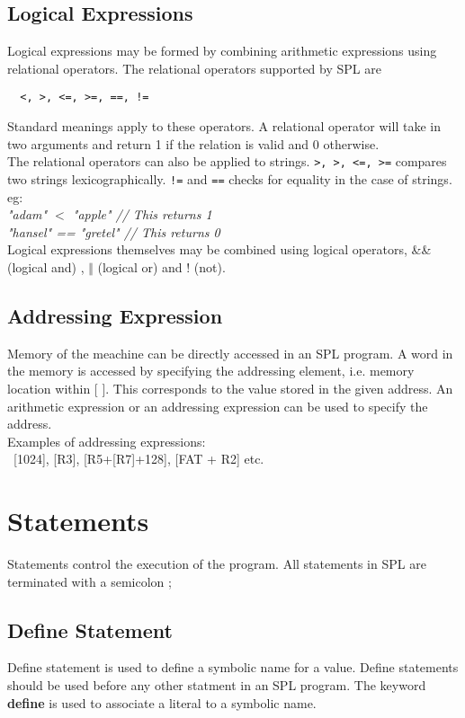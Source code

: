 \documentclass[11pt]{article}
\begin{document}
\subsection{Logical Expressions}

Logical expressions may be formed by combining arithmetic expressions using relational operators. 
The relational operators supported by SPL are \begin{verbatim}  <, >, <=, >=, ==, !=
\end{verbatim}
Standard  meanings apply to these operators. A relational operator will take in two arguments and return 1 if the relation is valid and 0 otherwise. \\
The relational operators can also be applied to strings. \texttt{>, >, <=, >=} compares two strings lexicographically.  \texttt{!=} and \texttt{==} checks for equality in the case of strings. eg:\\
     \textit{"adam" $<$ "apple" // This returns 1 }\\
     \textit{"hansel" == "gretel" // This returns 0 }\\
Logical expressions themselves may be combined using logical operators, \&\& (logical and) ,  $\Vert$ (logical or) and ! (not).



\subsection{Addressing Expression}
Memory of the meachine can be directly accessed in an SPL program. A word in the memory is accessed by specifying the addressing element, i.e. memory location within [ ]. This  corresponds to the value stored in the given address. An arithmetic expression or an addressing expression can be used to specify the address. \\

Examples of addressing expressions: \\\   
 [1024], [R3], [R5+[R7]+128], [FAT + R2] etc.

\section{Statements}

Statements control the execution of the program. All statements in SPL are terminated with a semicolon ;



\subsection{Define Statement}
Define statement is used to define a symbolic name for a value. Define statements should be  used before any other statment in an SPL program. The keyword \textbf{define} is used to associate a literal to a symbolic name. \\
\end{document}
